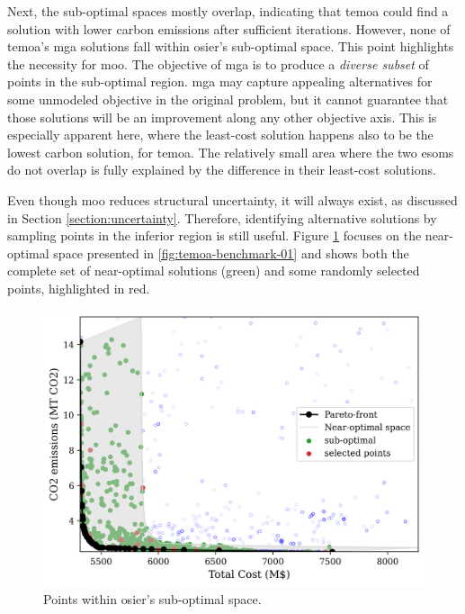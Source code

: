 Next, the sub-optimal spaces mostly overlap, indicating that \ac{temoa} could
find a solution with lower carbon emissions after sufficient iterations.
However, none of \ac{temoa}'s \ac{mga} solutions fall within \ac{osier}'s
sub-optimal space. This point highlights the necessity for \acl{moo}. The
objective of \ac{mga} is to produce a \textit{diverse subset} of points in the
sub-optimal region. \ac{mga} may capture appealing alternatives for some
unmodeled objective in the original problem, but it cannot guarantee that those
solutions will be an improvement along any other objective axis. This is
especially apparent here, where the least-cost solution happens also to be the
lowest carbon solution, for \ac{temoa}. The relatively small area where the two
\acp{esom} do not overlap is fully explained by the difference in their
least-cost solutions.

Even though \ac{moo} reduces structural uncertainty, it will always exist, as
discussed in Section \ref{section:uncertainty}. Therefore, identifying
alternative solutions by sampling points in the inferior region is still useful.
Figure \ref{fig:temoa-benchmark-02} focuses on the near-optimal space presented
in \ref{fig:temoa-benchmark-01} and shows both the complete set of near-optimal
solutions (green) and some randomly selected points, highlighted in red.

\begin{figure}[h]
  \centering
  \includegraphics[width=0.6\columnwidth]{figures/results/osier_mga_subset_01.png}
  \caption{Points within \ac{osier}'s sub-optimal space.}
  \label{fig:temoa-benchmark-02}
\end{figure}

